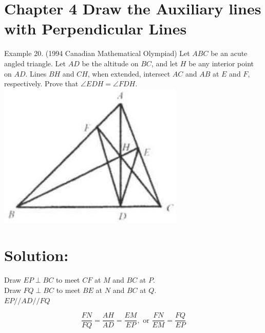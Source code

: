 \documentclass[10pt]{article}
\begin{document}
\section*{Chapter 4 Draw the Auxiliary lines with Perpendicular Lines}
Example 20. (1994 Canadian Mathematical Olympiad) Let \(A B C\) be an acute angled triangle. Let \(A D\) be the altitude on \(B C\), and let \(H\) be any interior point on \(A D\). Lines \(B H\) and \(C H\), when extended, intersect \(A C\) and \(A B\) at \(E\) and \(F\), respectively. Prove that \(\angle E D H=\angle F D H\).\\
\includegraphics[max width=\textwidth, center]{2025_04_17_97bc1f7e44d93c271a88g-087}

\section*{Solution:}
Draw \(E P \perp B C\) to meet \(C F\) at \(M\) and \(B C\) at \(P\).\\
Draw \(F Q \perp B C\) to meet \(B E\) at \(N\) and \(B C\) at \(Q\).\\
\(E P / / A D / / F Q\)

\[
\frac{F N}{F Q}=\frac{A H}{A D}=\frac{E M}{E P}, \text { or } \frac{F N}{E M}=\frac{F Q}{E P}
\]
\end{document}
